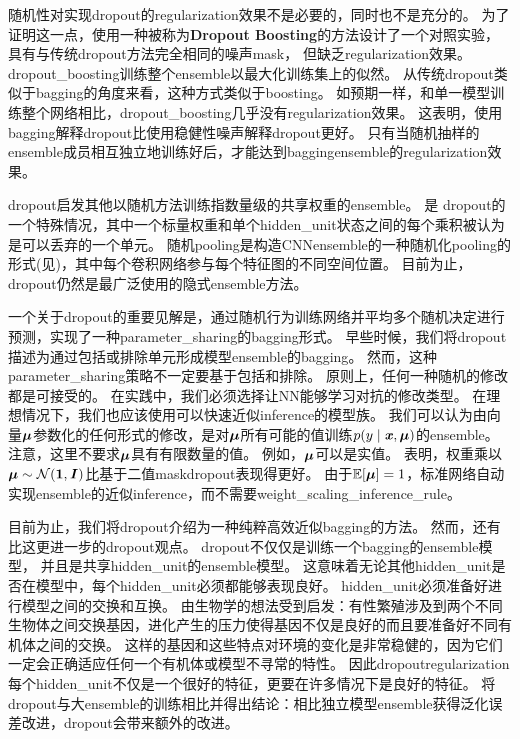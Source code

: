 
随机性对实现\gls{dropout}的\gls{regularization}效果不是必要的，同时也不是充分的。
为了证明这一点，\cite{WardeFarley+al-ICLR2014}使用一种被称为\textbf{Dropout Boosting}的方法设计了一个对照实验，具有与传统\gls{dropout}方法完全相同的噪声\gls{mask}， 但缺乏\gls{regularization}效果。
\gls{dropout_boosting}训练整个\gls{ensemble}以最大化训练集上的似然。
从传统\gls{dropout}类似于\gls{bagging}的角度来看，这种方式类似于\gls{boosting}。
如预期一样，和单一模型训练整个网络相比，\gls{dropout_boosting}几乎没有\gls{regularization}效果。
这表明，使用\gls{bagging}解释\gls{dropout}比使用稳健性噪声解释\gls{dropout}更好。
只有当随机抽样的\gls{ensemble}成员相互独立地训练好后，才能达到\gls{bagging}\gls{ensemble}的\gls{regularization}效果。

\gls{dropout}启发其他以随机方法训练指数量级的共享权重的\gls{ensemble}。
是
\gls{dropout}的一个特殊情况，其中一个标量权重和单个\gls{hidden_unit}状态之间的每个乘积被认为是可以丢弃的一个单元\citep{Wan+al-ICML2013-small}。
随机\gls{pooling}是构造\gls{CNN}\gls{ensemble}的一种随机化\gls{pooling}的形式(见)，其中每个卷积网络参与每个特征图的不同空间位置。
目前为止，\gls{dropout}仍然是最广泛使用的隐式\gls{ensemble}方法。

一个关于\gls{dropout}的重要见解是，通过随机行为训练网络并平均多个随机决定进行预测，实现了一种\gls{parameter_sharing}的\gls{bagging}形式。
早些时候，我们将\gls{dropout}描述为通过包括或排除单元形成模型\gls{ensemble}的\gls{bagging}。
然而，这种\gls{parameter_sharing}策略不一定要基于包括和排除。
原则上，任何一种随机的修改都是可接受的。
在实践中，我们必须选择让\gls{NN}能够学习对抗的修改类型。
在理想情况下，我们也应该使用可以快速近似\gls{inference}的模型族。
我们可以认为由向量$\boldsymbol{\mu}$参数化的任何形式的修改，是对$\boldsymbol{\mu}$所有可能的值训练$p(y \mid \boldsymbol{\mathit{x}}, \boldsymbol{\mu})$的\gls{ensemble}。
注意，这里不要求$\boldsymbol{\mu}$具有有限数量的值。
例如，$\boldsymbol{\mu}$可以是实值。
\cite{Srivastava14}表明，权重乘以$\boldsymbol{\mu} \sim \mathcal{N}(\mathbf{1}, \boldsymbol{\mathit{I}})$比基于二值\gls{mask}\gls{dropout}表现得更好。
由于$\mathbb{E}[\boldsymbol{\mu}] = 1$，标准网络自动实现\gls{ensemble}的近似\gls{inference}，而不需要\gls{weight_scaling_inference_rule}。


目前为止，我们将\gls{dropout}介绍为一种纯粹高效近似\gls{bagging}的方法。
然而，还有比这更进一步的\gls{dropout}观点。
\gls{dropout}不仅仅是训练一个\gls{bagging}的\gls{ensemble}模型，
并且是共享\gls{hidden_unit}的\gls{ensemble}模型。
这意味着无论其他\gls{hidden_unit}是否在模型中，每个\gls{hidden_unit}必须都能够表现良好。
\gls{hidden_unit}必须准备好进行模型之间的交换和互换。
\cite{Hinton-et-al-arxiv2012-small}由生物学的想法受到启发：有性繁殖涉及到两个不同生物体之间交换基因，进化产生的压力使得基因不仅是良好的而且要准备好不同有机体之间的交换。
这样的基因和这些特点对环境的变化是非常稳健的，因为它们一定会正确适应任何一个有机体或模型不寻常的特性。
因此\gls{dropout}\gls{regularization}每个\gls{hidden_unit}不仅是一个很好的特征，更要在许多情况下是良好的特征。
\cite{WardeFarley+al-ICLR2014}将\gls{dropout}与大\gls{ensemble}的训练相比并得出结论：相比独立模型\gls{ensemble}获得泛化误差改进，\gls{dropout}会带来额外的改进。

